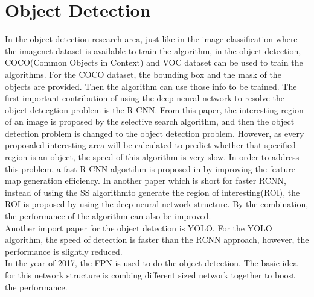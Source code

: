 \documentclass[a4paper,12pt]{article}
\begin{document}
\section{Object Detection}
In the object detection research area, just like in the image classification where the imagenet dataset is available to train the algorithm, in the object detection, COCO(Common Objects in Context)\cite{DBLP:journals/corr/LinMBHPRDZ14} and VOC dataset can be used to train the algorithms. For the COCO dataset, the bounding box and the mask of the objects are provided. Then the algorithm can use those info to be trained. The first important contribution of using the deep neural network to resolve the object detecgtion problem is the R-CNN\cite{DBLP:journals/corr/GirshickDDM13}. From this paper, the interesting region of an image is proposed by the selective search algorithm, and then the object detection problem is changed to the object detection problem. However, as every proposaled interesting area will be calculated to predict whether that specified region is an object, the speed of this algorithm is very slow. In order to address this problem, a fast R-CNN algortihm is proposed in \cite{DBLP:conf/iccv/Girshick15} by improving the feature map generation efficiency. In another paper which is short for faster RCNN\cite{DBLP:conf/nips/RenHGS15}, instead of using the SS algorithmto generate the region of interesting(ROI), the ROI is proposed by using the deep neural network structure. By the combination, the performance of the algorithm can also be improved.\\
Another import paper for the object detection is YOLO\cite{DBLP:journals/corr/RedmonDGF15}\cite{DBLP:journals/corr/RedmonF16}. For the YOLO algorithm, the speed of detection is faster than the RCNN approach, however, the performance is slightly reduced. \\
In the year of 2017, the FPN\cite{DBLP:journals/corr/LinDGHHB16} is used to do the object detection. The basic idea for this network structure is combing different sized network together to boost the performance.\\
\end{document}
